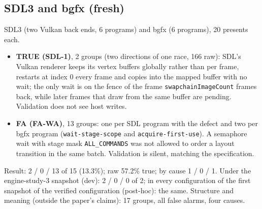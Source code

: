 \documentclass[acmtog,anonymous,review]{acmart}
\newcommand{\code}[1]{\texttt{#1}}
\begin{document}
\subsection{SDL3 and bgfx (fresh)}
SDL3 (two Vulkan back ends, 6 programs) and bgfx (6 programs), 20 presents each.
\begin{itemize}
\item \textbf{TRUE (SDL-1)}, 2 groups (two directions of one race, 166 raw): SDL's Vulkan renderer keeps its vertex
  buffers globally rather than per frame, restarts at index 0 every frame and copies into the mapped buffer with no
  wait; the only wait is on the fence of the frame \code{swapchainImageCount} frames back, while later frames that
  draw from the same buffer are pending. Validation does not see host writes.
\item \textbf{FA (FA-WA)}, 13 groups: one per SDL program with the defect and two per bgfx program
  (\code{wait-stage-scope} and \code{acquire-first-use}). A semaphore wait with stage mask \code{ALL\_COMMANDS} was not
  allowed to order a layout transition in the same batch. Validation is silent, matching the specification.
\end{itemize}
Result: 2 / 0 / 13 of 15 (13.3\%); raw 57.2\% true; by cause 1 / 0 / 1. Under the engine-study-3 snapshot (dev):
2 / 0 / 0 of 2; in every configuration of the first snapshot of the verified configuration (post-hoc): the same. Structure and meaning (outside the paper's claims): 17 groups, all false
alarms, four causes.
\end{document}
